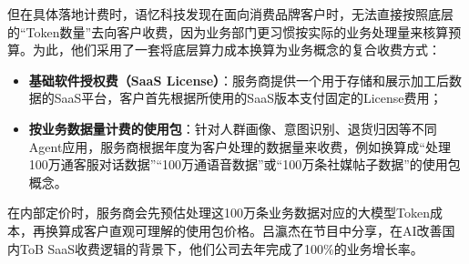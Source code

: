 \documentclass[UTF8,a4paper,11pt,fontset=fandol]{ctexart}
\begin{document}
但在具体落地计费时，语忆科技发现在面向消费品牌客户时，无法直接按照底层的“Token数量”去向客户收费，因为业务部门更习惯按实际的业务处理量来核算预算。为此，他们采用了一套将底层算力成本换算为业务概念的复合收费方式：
\begin{itemize}
\item \textbf{基础软件授权费（SaaS License）}：服务商提供一个用于存储和展示加工后数据的SaaS平台，客户首先根据所使用的SaaS版本支付固定的License费用；
\item \textbf{按业务数据量计费的使用包}：针对人群画像、意图识别、退货归因等不同Agent应用，服务商根据年度为客户处理的数据量来收费，例如换算成“处理100万通客服对话数据”“100万通语音数据”或“100万条社媒帖子数据”的使用包概念。
\end{itemize}
在内部定价时，服务商会先预估处理这100万条业务数据对应的大模型Token成本，再换算成客户直观可理解的使用包价格。吕瀛杰在节目中分享，在AI改善国内ToB SaaS收费逻辑的背景下，他们公司去年完成了100\%的业务增长率。
\end{document}

